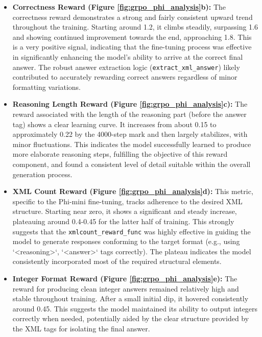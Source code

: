 \documentclass[11pt]{article}
\begin{document}
\begin{itemize}
\begin{itemize}
    \item \textbf{Correctness Reward (Figure \ref{fig:grpo_phi_analysis}b):} The correctness reward demonstrates a strong and fairly consistent upward trend throughout the training. Starting around 1.2, it climbs steadily, surpassing 1.6 and showing continued improvement towards the end, approaching 1.8. This is a very positive signal, indicating that the fine-tuning process was effective in significantly enhancing the model's ability to arrive at the correct final answer. The robust answer extraction logic (\texttt{extract\_xml\_answer}) likely contributed to accurately rewarding correct answers regardless of minor formatting variations.

    \item \textbf{Reasoning Length Reward (Figure \ref{fig:grpo_phi_analysis}c):} The reward associated with the length of the reasoning part (before the answer tag) shows a clear learning curve. It increases from about 0.15 to approximately 0.22 by the 4000-step mark and then largely stabilizes, with minor fluctuations. This indicates the model successfully learned to produce more elaborate reasoning steps, fulfilling the objective of this reward component, and found a consistent level of detail suitable within the overall generation process.

    \item \textbf{XML Count Reward (Figure \ref{fig:grpo_phi_analysis}d):} This metric, specific to the Phi-mini fine-tuning, tracks adherence to the desired XML structure. Starting near zero, it shows a significant and steady increase, plateauing around 0.4-0.45 for the latter half of training. This strongly suggests that the \texttt{xmlcount\_reward\_func} was highly effective in guiding the model to generate responses conforming to the target format (e.g., using `<reasoning>`, `<answer>` tags correctly). The plateau indicates the model consistently incorporated most of the required structural elements.

    \item \textbf{Integer Format Reward (Figure \ref{fig:grpo_phi_analysis}e):} The reward for producing clean integer answers remained relatively high and stable throughout training. After a small initial dip, it hovered consistently around 0.45. This suggests the model maintained its ability to output integers correctly when needed, potentially aided by the clear structure provided by the XML tags for isolating the final answer.


\end{itemize}
\end{itemize}
\end{document}
